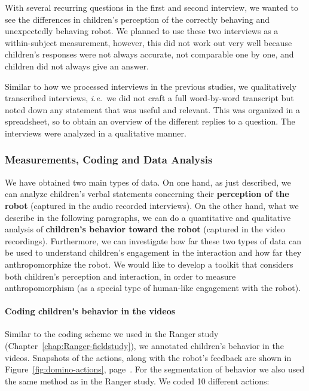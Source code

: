 \documentclass{sig-alternate}
\newcommand{\ie}{{\textit{i.e.~}}}
\begin{document}
With several recurring questions in the first and second interview, we wanted to
see the differences in children's perception of the correctly behaving and
unexpectedly behaving robot. We planned to use these two interviews as a
within-subject measurement, however, this did not work out very well because
children's responses were not always accurate, not comparable one by one, and
children did not always give an answer.	




Similar to how we processed interviews in the previous studies, we qualitatively
transcribed interviews, \ie we did not craft a full word-by-word transcript but
noted down any statement that was useful and relevant. This was organized in a
spreadsheet, so to obtain an overview of the different replies to a question.
The interviews were analyzed in a qualitative manner.	


\subsubsection{Measurements, Coding and Data Analysis}

We have obtained two main types of data. On one hand, as just described, we can
analyze children's verbal statements concerning their \textbf{perception of the
robot} (captured in the audio recorded interviews). On the other hand, what we
describe in the following paragraphs, we can do a quantitative and qualitative
analysis of \textbf{children's behavior toward the robot} (captured in the video
recordings). Furthermore, we can investigate how far these two types of data can
be used to understand children's engagement in the interaction and how far they
anthropomorphize the robot. We would like to develop a toolkit that considers
both children's perception and interaction, in order to measure anthropomorphism
(as a special type of human-like engagement with the robot).	

\paragraph{Coding children's behavior in the videos}	
\label{sec:domino-coding}	

Similar to the coding scheme we used in the Ranger study
(Chapter~\ref{chap:Ranger-fieldstudy}), we annotated children's behavior in the
videos. Snapshots of the actions, along with the robot's feedback are shown in
Figure~\ref{fig:domino-actions}, page~\pageref{fig:domino-actions}. For the
segmentation of behavior we also used the same method as in the Ranger study. We
coded 10 different actions:	
	
\end{document}
